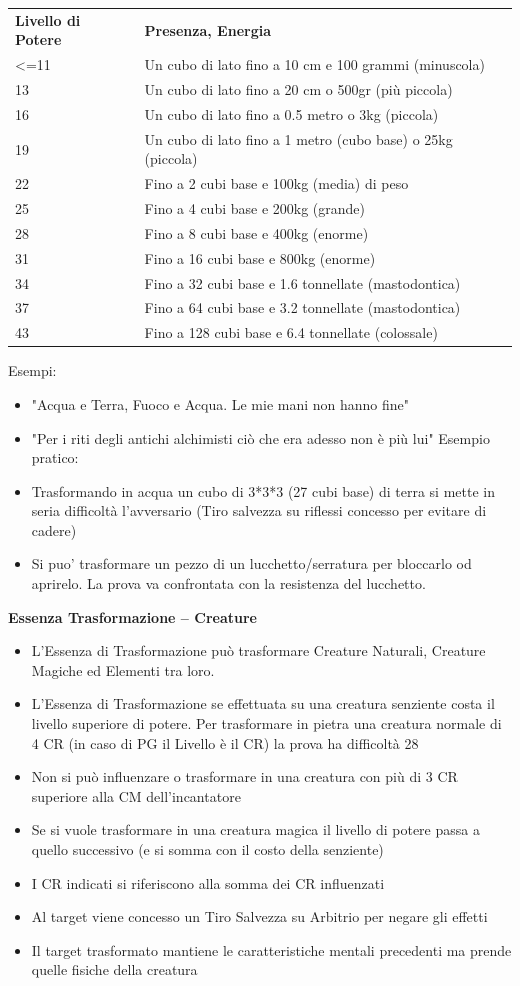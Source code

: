 \documentclass[a4paper,11pt,twoside,openany]{book}
\begin{document}
\bigskip
\begin{tabularx}{\textwidth}{lX}
	\toprule
	\textbf{Livello di Potere} & \textbf{Presenza, Energia}\tabularnewline
	\textless=11& Un cubo di lato fino a 10 cm e 100 grammi (minuscola)\tabularnewline
	13& Un cubo di lato fino a 20 cm o 500gr (più piccola)\tabularnewline
	16& Un cubo di lato fino a 0.5 metro o 3kg (piccola)\tabularnewline
	19& Un cubo di lato fino a 1 metro (cubo base) o 25kg (piccola)\tabularnewline
	22& Fino a 2 cubi base e 100kg (media) di peso\tabularnewline
	25& Fino a 4 cubi base e 200kg (grande)\tabularnewline
	28& Fino a 8 cubi base e 400kg (enorme)\tabularnewline
	31& Fino a 16 cubi base e 800kg (enorme)\tabularnewline
	34& Fino a 32 cubi base e 1.6 tonnellate (mastodontica)\tabularnewline
	37& Fino a 64 cubi base e 3.2 tonnellate (mastodontica)\tabularnewline
	43& Fino a 128 cubi base e 6.4 tonnellate (colossale)\tabularnewline
\end{tabularx}

Esempi:
\begin{itemize}
	\item
	      "Acqua e Terra, Fuoco e Acqua. Le mie mani non hanno fine"
	\item
	      "Per i riti degli antichi alchimisti ciò che era adesso non è più lui"
	      Esempio pratico:
	\item
	      Trasformando in acqua un cubo di 3{*}3{*}3 (27 cubi base) di terra si mette in seria difficoltà l'avversario (Tiro salvezza su riflessi concesso per evitare di cadere)
	\item
		  Si puo' trasformare un pezzo di un lucchetto/serratura per bloccarlo od aprirelo. La prova va confrontata con la resistenza del lucchetto.      
\end{itemize}

\bigskip

\textbf{Essenza Trasformazione -- Creature}

\begin{itemize}
	\item
	      L'Essenza di Trasformazione può trasformare Creature Naturali, Creature Magiche ed Elementi tra loro.
	\item
	      L'Essenza di Trasformazione se effettuata su una creatura senziente costa il livello superiore di potere. Per trasformare in pietra una creatura normale di 4 CR (in caso di PG il Livello è il CR) la prova ha difficoltà 28
	\item
	      Non si può influenzare o trasformare in una creatura con più di 3 CR superiore alla CM dell'incantatore
	\item
	      Se si vuole trasformare in una creatura magica il livello di potere passa a quello successivo (e si somma con il costo della senziente)
	\item
	      I CR indicati si riferiscono alla somma dei CR influenzati
	\item
	      Al target viene concesso un Tiro Salvezza su Arbitrio per negare gli effetti
	\item
	      Il target trasformato mantiene le caratteristiche mentali precedenti
	      ma prende quelle fisiche della creatura
\end{itemize}
\end{document}
